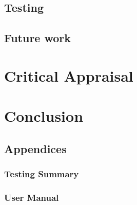 \documentclass{report}
\begin{document}
\section{Testing}
\section{Future work}
\chapter{Critical Appraisal}
\chapter{Conclusion}

\newpage
\cite{Agarwal2012}


\newpage
\section*{Appendices}
\subsection*{Testing Summary}
\subsection*{User Manual}
\end{document}
